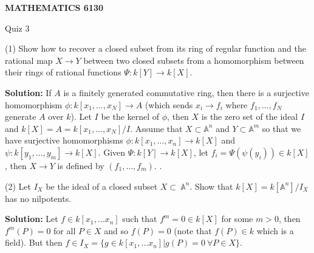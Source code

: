 \documentclass[12pt]{amsart}
\begin{document}
\bigskip\bigskip\bigskip\bigskip
\centerline{\bf MATHEMATICS 6130}
\centerline{Quiz 3}

(1) Show how to recover a closed subset from
its ring of regular function and the rational map $X\to Y$
between two closed subsets from a homomorphism between their rings of rational 
functions $\Psi : k[Y]\to k[X]$.


{\bf Solution:} If $A$ is a finitely generated commutative ring, then there is a surjective homomorphism $\phi:k[x_1,\ldots , x_N]\to A$ (which sends $x_i\to f_i$ where $f_1,\ldots, f_N$ generate $A$ over $k$). Let $I$ be the kernel of $\phi$, then $X$ is the zero set of the ideal $I$ and $k[X]=A=k[x_1,\ldots , x_N]/I$. Assume that $X\subset \mathbb A^n$ and $Y\subset \mathbb A^m$ so that we have surjective homomorphisms $\phi:k[x_1,\ldots , x_n]\to k[X]$ and $\psi:k[y_1,\ldots , y_m]\to k[X]$. Given $\Psi :k[Y]\to k[X]$, let $f_i=\Psi (\psi (y_i))\in k[X]$, then $X\to Y$ is defined by $(f_1,\ldots ,f_m)$. .

(2) Let $I_X$ be the ideal of a closed subset $X\subset\
 \mathbb A ^n$. Show that $k[X]=k[\mathbb A ^n]/I_X$ has no nilpotents.


{\bf Solution:} Let $f\in k[x_1,\ldots x_n]$ such that $f^m=0\in k[X]$ for some $m>0$, then $f^m(P)=0$ for all $P\in X$ and so $f(P)=0$ (note that $f(P)\in k$ which is a field). But then $f\in I_X=\{ g\in k[x_1,\ldots x_n]|g(P)=0\ \forall 
P\in X\}$.
\end{document}
